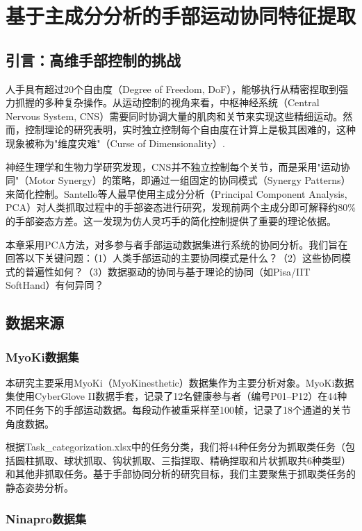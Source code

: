 \documentclass[12pt,a4paper]{report}
\begin{document}
\chapter{基于主成分分析的手部运动协同特征提取}

\section{引言：高维手部控制的挑战}

人手具有超过20个自由度（Degree of Freedom, DoF），能够执行从精密捏取到强力抓握的多种复杂操作。从运动控制的视角来看，中枢神经系统（Central Nervous System, CNS）需要同时协调大量的肌肉和关节来实现这些精细运动。然而，控制理论的研究表明，实时独立控制每个自由度在计算上是极其困难的，这种现象被称为"维度灾难"（Curse of Dimensionality）\cite{santello1998}. 

神经生理学和生物力学研究发现，CNS并不独立控制每个关节，而是采用"运动协同"（Motor Synergy）的策略\cite{soechting1992}，即通过一组固定的协同模式（Synergy Patterns）来简化控制。Santello等人\cite{santello1998}最早使用主成分分析（Principal Component Analysis, PCA）对人类抓取过程中的手部姿态进行研究，发现前两个主成分即可解释约80\%的手部姿态方差。这一发现为仿人灵巧手的简化控制提供了重要的理论依据。

本章采用PCA方法，对多参与者手部运动数据集进行系统的协同分析。我们旨在回答以下关键问题：（1）人类手部运动的主要协同模式是什么？（2）这些协同模式的普遍性如何？（3）数据驱动的协同与基于理论的协同（如Pisa/IIT SoftHand）有何异同？

\section{数据来源}

\subsection{MyoKi数据集}

本研究主要采用MyoKi（MyoKinesthetic）数据集\cite{myoki2023}作为主要分析对象。MyoKi数据集使用CyberGlove II数据手套，记录了12名健康参与者（编号P01--P12）在44种不同任务下的手部运动数据。每段动作被重采样至100帧，记录了18个通道的关节角度数据。

根据Task\_categorization.xlsx中的任务分类，我们将44种任务分为抓取类任务（包括圆柱抓取、球状抓取、钩状抓取、三指捏取、精确捏取和片状抓取共6种类型）和其他非抓取任务。基于手部协同分析的研究目标，我们主要聚焦于抓取类任务的静态姿势分析。

\subsection{Ninapro数据集}
\end{document}
